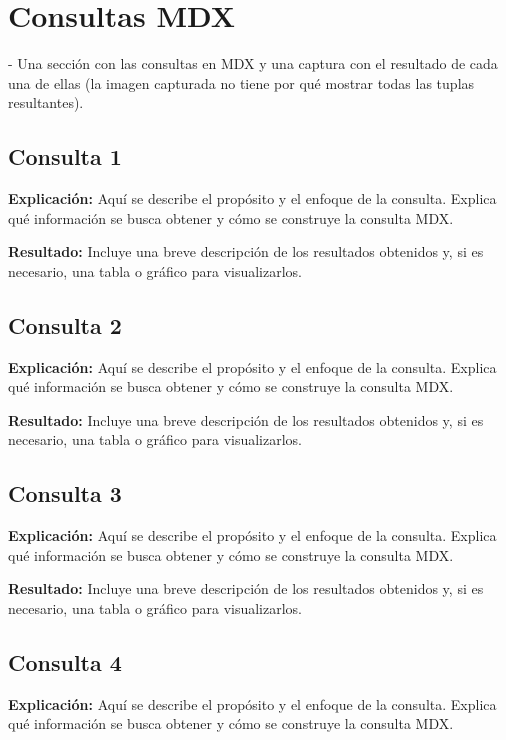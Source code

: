 \documentclass{article}
\begin{document}
	
	\section{Consultas MDX}
	- Una sección con las consultas en MDX y una captura con el resultado de cada una de ellas (la imagen capturada no tiene por qué mostrar todas las tuplas resultantes). 

\subsection{Consulta 1}

\textbf{Explicación:}  
Aquí se describe el propósito y el enfoque de la consulta. Explica qué información se busca obtener y cómo se construye la consulta MDX.

\textbf{Resultado:}  
Incluye una breve descripción de los resultados obtenidos y, si es necesario, una tabla o gráfico para visualizarlos.

\subsection{Consulta 2}

\textbf{Explicación:}  
Aquí se describe el propósito y el enfoque de la consulta. Explica qué información se busca obtener y cómo se construye la consulta MDX.

\textbf{Resultado:}  
Incluye una breve descripción de los resultados obtenidos y, si es necesario, una tabla o gráfico para visualizarlos.


\subsection{Consulta 3}

\textbf{Explicación:}  
Aquí se describe el propósito y el enfoque de la consulta. Explica qué información se busca obtener y cómo se construye la consulta MDX.

\textbf{Resultado:}  
Incluye una breve descripción de los resultados obtenidos y, si es necesario, una tabla o gráfico para visualizarlos.

\subsection{Consulta 4}

\textbf{Explicación:}  
Aquí se describe el propósito y el enfoque de la consulta. Explica qué información se busca obtener y cómo se construye la consulta MDX.
\end{document}

